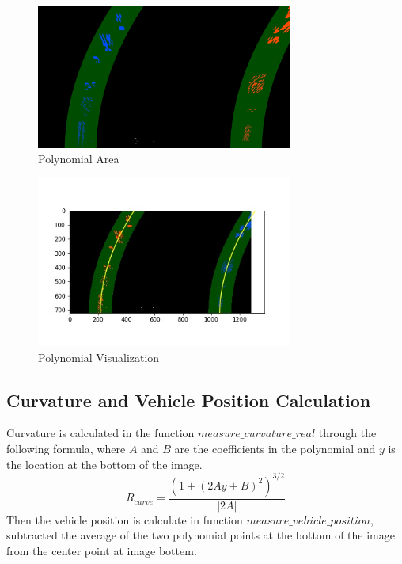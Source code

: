 \documentclass{article}
\begin{document}
\begin{figure}[h!t]
\begin{center}
\includegraphics[width=0.75\textwidth]{../output_images/polynomialfit/v2test5.jpg}
\caption{Polynomial Area}
\label{fig6}
\end{center}
\end{figure}

\begin{figure}[h!t]
\begin{center}
\includegraphics[width=0.75\textwidth]{../output_images/polynomialfit/v3test5.jpg}
\caption{Polynomial Visualization}
\label{fig7}
\end{center}
\end{figure}

\subsection{Curvature and Vehicle Position Calculation} 
Curvature is calculated in the function $measure\_curvature\_real$ through the following formula, where $A$ and $B$ are the coefficients in the polynomial and $y$ is the location at the bottom of the image.\\
\begin{equation}
R_{curve}=\frac{(1+(2Ay+B)^2)^{3/2}}{|2A|}
\end{equation}
Then the vehicle position is calculate in function $measure\_vehicle\_position$, subtracted the average of the two polynomial points at the bottom of the image from the center point at image bottem.
\end{document}
